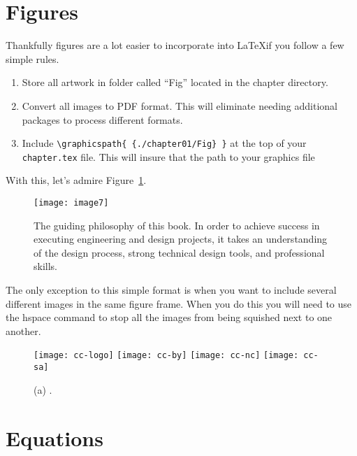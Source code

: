 \section{Figures}
\label{section:howToTables}

Thankfully figures are a lot easier to incorporate into \LaTeX if you follow a few simple rules.
\begin{enumerate}
\item Store all artwork in folder called ``Fig'' located in the chapter directory.
\item Convert all images to PDF format. This will eliminate needing additional packages to process different formats.
\item Include \verb+\graphicspath{ {./chapter01/Fig} }+ at the top of your \verb+chapter.tex+ file.
	This will insure that the path to your graphics file
\end{enumerate}

With this, let's admire Figure~\ref{table:bookPhilosophy}. 

\begin{figure}[h]
\texttt{[image: image7]}

\caption{The guiding philosophy of this book. In order to
achieve success in executing engineering and design projects, it takes
an understanding of the design process, strong technical design tools,
and professional skills.}
\label{table:bookPhilosophy}
\end{figure}

The only exception to this simple format is when you want to include
several different images in the same figure frame.  When you do this
you will need to use the hspace command to stop all the images
from being squished next to one another.

\begin{figure}[h]
\hspace{1cm}
\texttt{[image: cc-logo]}
\hspace{1cm}
\texttt{[image: cc-by]}
\hspace{1cm}
\texttt{[image: cc-nc]}
\hspace{1cm}
\texttt{[image: cc-sa]}
\caption{(a) .}
\label{figure:howToCommonCollectiveLicense}
\end{figure}

\section{Equations}
\label{section:howToEquations}

